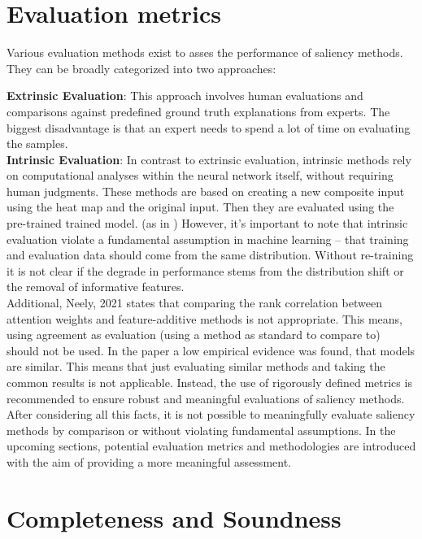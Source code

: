 \section{Evaluation metrics \cite{gupta2022new}}

Various evaluation methods exist to asses the performance of saliency methods. They can be broadly categorized into two approaches: \cite{gupta2022new}


\textbf{Extrinsic Evaluation}: 
 This approach involves human evaluations and comparisons against predefined ground truth explanations from experts.\cite{zhang2018} The biggest disadvantage is that an expert needs to spend a lot of time on evaluating the samples.
\\
\textbf{Intrinsic Evaluation}: 
In contrast to extrinsic evaluation, intrinsic methods rely on computational analyses within the neural network itself, without requiring human judgments. These methods are based on creating a new composite input using the heat map and the original input. Then they are evaluated using the pre-trained trained model. (as in \cite{dabkowski2017real}) However, it's important to note that intrinsic evaluation violate a fundamental assumption in machine learning – that training and evaluation data should come from the same distribution.  Without re-training it is not clear if the degrade in performance stems from the distribution shift or the removal of informative features. \cite{hooker2019benchmark}
\\
Additional, Neely, 2021\cite{neely2021order} states that comparing the rank correlation between attention weights and feature-additive methods is not appropriate. This means, using agreement as evaluation (using a method as standard to compare to) should not be used. In the paper a low empirical evidence was found, that models are similar. This means that just evaluating similar methods and taking the common results is not applicable.  Instead, the use of rigorously defined metrics is recommended to ensure robust and meaningful evaluations of saliency methods.
\\
After considering all this facts, it is not possible to meaningfully evaluate saliency methods by comparison or without violating fundamental assumptions.  In the upcoming sections, potential evaluation metrics and methodologies are introduced with the aim of providing a more meaningful assessment.

\section{Completeness and Soundness}

